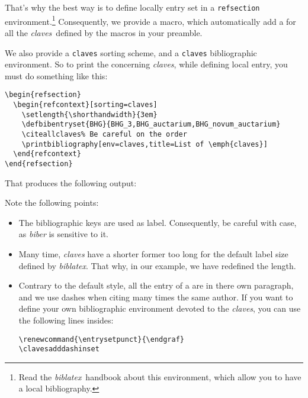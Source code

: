 \documentclass{ltxdockit}[2011/03/25]
\newcommand{\biblatex}{\emph{biblatex}\xspace}
\newcommand{\claves}{\emph{claves}\xspace}
\begin{document}
 That's why the best way is to define locally entry set in a \verb+refsection+ environment.\footnote{Read the \biblatex\ handbook about this environment, which allow you to have a local bibliography.} Consequently, we provide a  macro, which automatically add a  for all the \claves\ defined by the  macros in your preamble.

 We also provide a \verb+claves+ sorting scheme, and a \verb+claves+ bibliographic environment. So to print the concerning \claves, while defining local  entry, you must do something like this:
\begin{verbatim}
\begin{refsection}
  \begin{refcontext}[sorting=claves]
    \setlength{\shorthandwidth}{3em}
    \defbibentryset{BHG}{BHG_3,BHG_auctarium,BHG_novum_auctarium}
    \citeallclaves% Be careful on the order
    \printbibliography[env=claves,title=List of \emph{claves}]
  \end{refcontext}
\end{refsection}
\end{verbatim}

That produces the following output:
\begin{quotation}
\begin{refsection}
  \begin{refcontext}[sorting=claves]
    \setlength{\shorthandwidth}{3em}
    \citeallclaves
    \printbibliography[env=claves,title=List of \emph{claves}]
  \end{refcontext}
\end{refsection}
\end{quotation}

Note the following points:
\begin{itemize}
  \item The bibliographic keys are used as label. Consequently, be careful with case, as \emph{biber} is sensitive to it.
  \item Many time, \claves have a shorter former too long for the default label size defined by \biblatex.
    That why, in our example, we have redefined the  length.
  \item Contrary to the default style, all the entry of a  are in there own paragraph, and we use dashes when citing many times the same author. If you want to define your own bibliographic environment devoted to the \claves, you can use the following lines insides:
    \begin{verbatim}
\renewcommand{\entrysetpunct}{\endgraf}
\clavesadddashinset
    \end{verbatim}
\end{itemize}
\end{document}
